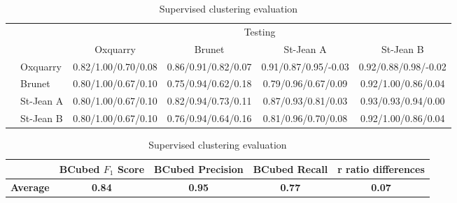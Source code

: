 \begin{table}
  \centering
  \caption{Supervised clustering evaluation}
  \label{tab:supervised_clustering}

  \label{tab:supervised_clustering_train_test}
  \begin{tabular}{l l| c c c c}
    \toprule
    \multicolumn{2}{c}{\multirow{2}{*}{}} & \multicolumn{4}{c}{Testing}\\
    \multicolumn{2}{c}{}
                    & Oxquarry & Brunet & St-Jean A & St-Jean B \\
        \midrule
    \parbox[t]{2mm}{}
        & Oxquarry
        & 0.82/1.00/0.70/0.08
        & 0.86/0.91/0.82/0.07
        & 0.91/0.87/0.95/-0.03
        & 0.92/0.88/0.98/-0.02
        \\
        & Brunet
        & 0.80/1.00/0.67/0.10
        & 0.75/0.94/0.62/0.18
        & 0.79/0.96/0.67/0.09
        & 0.92/1.00/0.86/0.04
        \\
        & St-Jean A
        & 0.80/1.00/0.67/0.10
        & 0.82/0.94/0.73/0.11
        & 0.87/0.93/0.81/0.03
        & 0.93/0.93/0.94/0.00
        \\
        & St-Jean B
        & 0.80/1.00/0.67/0.10
        & 0.76/0.94/0.64/0.16
        & 0.81/0.96/0.70/0.08
        & 0.92/1.00/0.86/0.04
        \\
        \bottomrule
  \end{tabular}

  \label{tab:supervised_clustering_average}
  \begin{tabular}{l c c c c}
    \toprule
    &
    BCubed $F_1$ Score &
    BCubed Precision &
    BCubed Recall &
    r ratio differences \\
    \midrule
    \textbf{Average}
    & \textbf{0.84}
    & \textbf{0.95}
    & \textbf{0.77}
    & \textbf{0.07}
    \\
    \bottomrule
  \end{tabular}
\end{table}
